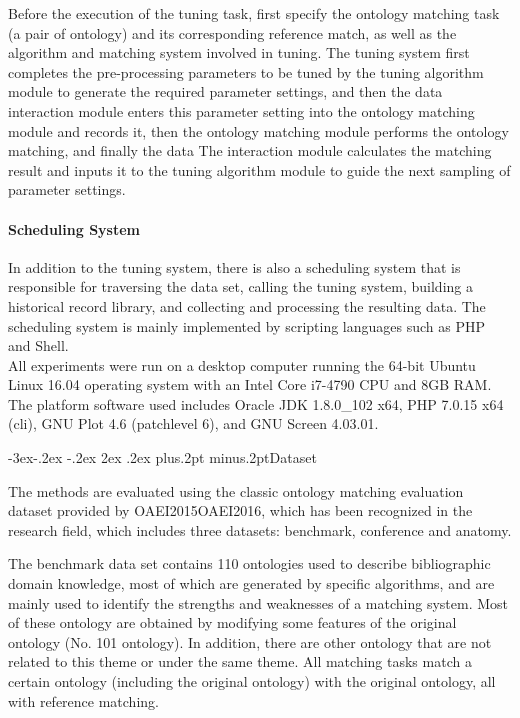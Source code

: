 \documentclass[twoside]{article}
\makeatletter
\def\subsection{\@startsection{subsection}{2}{\z@}%
 {-3ex\@plus -.2ex \@minus -.2ex}%
 {2ex \@plus.2ex}%
{\normalfont\normalsize\protect\baselineskip=12.5pt plus.2pt minus.2pt\bfseries}}
\makeatother
\begin{document}
\begin{multicols}{2}
Before the execution of the tuning task, first specify the ontology matching task (a pair of ontology) and its corresponding reference match, as well as the algorithm and matching system involved in tuning. 
The tuning system first completes the pre-processing parameters to be tuned by the tuning algorithm module to generate the required parameter settings, and then the data interaction module enters this parameter setting into the ontology matching module and records it, then the ontology matching module performs the ontology matching, and finally the data The interaction module calculates the matching result and inputs it to the tuning algorithm module to guide the next sampling of parameter settings.

\paragraph{Scheduling System}
In addition to the tuning system, there is also a scheduling system that is responsible for traversing the data set, calling the tuning system, building a historical record library, and collecting and processing the resulting data. The scheduling system is mainly implemented by scripting languages such as PHP and Shell. \\

All experiments were run on a desktop computer running the 64-bit Ubuntu Linux 16.04 operating system with an Intel Core i7-4790 CPU and 8GB RAM. 
The platform software used includes Oracle JDK 1.8.0\_102 x64, PHP 7.0.15 x64 (cli), GNU Plot 4.6 (patchlevel 6), and GNU Screen 4.03.01.

\subsection{Dataset}
\label{sec:datasets}

The methods are evaluated using the classic ontology matching evaluation dataset provided by OAEI2015OAEI2016\cite{wwy58}, which has been recognized in the research field, which includes three datasets: benchmark, conference and anatomy.

The benchmark data set contains 110 ontologies used to describe bibliographic domain knowledge, most of which are generated by specific algorithms, and are mainly used to identify the strengths and weaknesses of a matching system. Most of these ontology are obtained by modifying some features of the original ontology (No. 101 ontology). In addition, there are other ontology that are not related to this theme or under the same theme.
All matching tasks match a certain ontology (including the original ontology) with the original ontology, all with reference matching.


\end{multicols}
\end{document}
